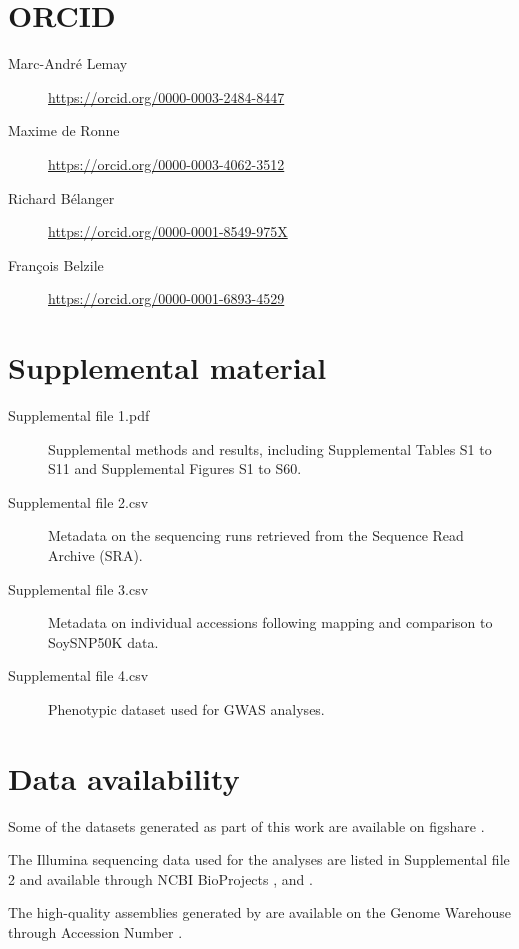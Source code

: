 \documentclass{article}
\begin{document}
\section*{ORCID}

\begin{description}
	\item[Marc-André Lemay] \url{https://orcid.org/0000-0003-2484-8447}
	\item[Maxime de Ronne] \url{https://orcid.org/0000-0003-4062-3512}
	\item[Richard Bélanger] \url{https://orcid.org/0000-0001-8549-975X}
	\item[François Belzile] \url{https://orcid.org/0000-0001-6893-4529}
\end{description}

\section*{Supplemental material}

\begin{description}
	\item[Supplemental file 1.pdf] Supplemental methods and results, including
		Supplemental Tables S1 to S11 and Supplemental Figures S1 to
		S60.

	\item[Supplemental file 2.csv] Metadata on the sequencing runs retrieved
		from the Sequence Read Archive (SRA).

	\item[Supplemental file 3.csv] Metadata on individual accessions following
		mapping and comparison to SoySNP50K data.

	\item[Supplemental file 4.csv] Phenotypic dataset used for GWAS analyses.
\end{description}

\section*{Data availability}

Some of the datasets generated as part of this work are available on figshare
.

The Illumina sequencing data used for the analyses are listed in Supplemental file 2
and available through NCBI BioProjects \citeauthor{PRJNA257011}, \citeauthor{PRJNA289660}
and \citeauthor{PRJNA639876}.

The high-quality assemblies generated by  are available
on the Genome Warehouse through Accession Number \citeauthor{PRJCA002030}.
\end{document}
